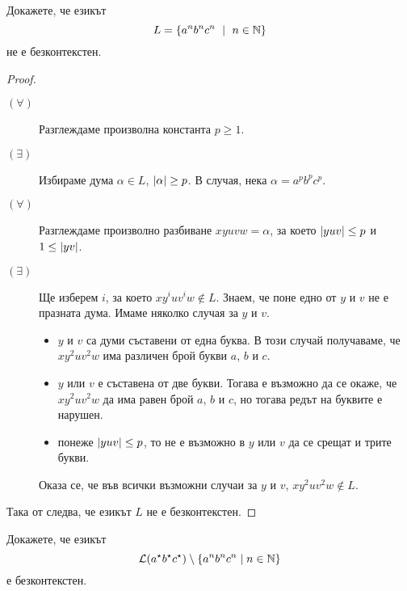 \begin{problem}
  \label{prob:anbncn}
  Докажете, че езикът 
  \[L = \{a^nb^nc^n\ \mid\ n\in\Nat\}\]
  не е безконтекстен.
\end{problem}
\begin{proof}
  \begin{description}
  \item[$(\forall)$]
    Разглеждаме произволна константа $p \geq 1$.
  \item[$(\exists)$]
    Избираме дума $\alpha \in L$, $\vert{\alpha}\vert \geq p$.
    В случая, нека $\alpha = a^pb^pc^p$.
  \item[$(\forall)$]
    Разглеждаме произволно разбиване $xyuvw = \alpha$, за което $\vert{yuv}\vert \leq p$ и $1 \leq \vert{yv}\vert$.
  \item[$(\exists)$]
    Ще изберем $i$, за което $xy^iuv^iw \not\in L$.
    Знаем, че поне едно от $y$ и $v$ не е празната дума.
    Имаме няколко случая за $y$ и $v$.
    \begin{itemize}
    \item
      $y$ и $v$ са думи съставени от една буква.
      В този случай получаваме, че $xy^2uv^2w$ има различен брой букви $a$, $b$ и $c$.
    \item
      $y$ или $v$ е съставена от две букви.
      Тогава е възможно да се окаже, че $xy^2uv^2w$ да има равен брой $a$, $b$ и $c$,
      но тогава редът на буквите е нарушен.
    \item
      понеже $\vert{yuv}\vert \leq p$, то не е възможно в $y$ или $v$ да се срещат и трите букви.
    \end{itemize}  
    Оказа се, че във всички възможни случаи за $y$ и $v$, 
    $xy^2uv^2w \not\in L$.
  \end{description}
  Така от  следва, че езикът $L$ не е безконтекстен.
\end{proof}

\begin{problem}
  Докажете, че езикът
  \[\mathcal{L}(a^\star b^\star c^\star) \setminus \{a^nb^nc^n \mid n \in \mathbb{N}\}\]
  е безконтекстен.
\end{problem}

